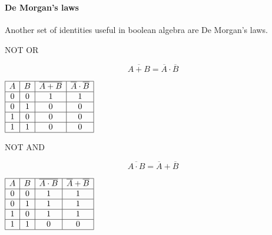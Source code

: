 \documentclass{beamer}
\newenvironment{compactmath}[1][\normalsize]%
	{\begin{minipage}{\textwidth}\vspace{-0.75\baselineskip}#1\begin{equation*}}
	{\end{equation*}\end{minipage}}
\newenvironment{namedframe}[1]%
	{\begin{frame}\frametitle{\secname}\framesubtitle{#1}}
	{\end{frame}}
\newcommand{\negate}[1]{\overline{#1}}
\begin{document}
	\begin{namedframe}{De Morgan's laws}
		Another set of identities useful in boolean algebra are De Morgan's laws.
		\begin{center}
			\pause
			\begin{minipage}{0.425\textwidth}
				\centering
				\begin{block}{NOT OR}
					\begin{compactmath}
						\negate{A + B} = \negate{A} \cdot \negate{B}
					\end{compactmath}
				\end{block}
				\begin{math}
					\begin{array}{|c|c|c|c|}
						\hline
						A & B & \negate{A + B} & \negate{A} \cdot \negate{B}\\\hline
						0 & 0 &  1             &  1                         \\\hline
						0 & 1 &  0             &  0                         \\\hline
						1 & 0 &  0             &  0                         \\\hline
						1 & 1 &  0             &  0                         \\\hline
					\end{array}
				\end{math}
			\end{minipage}
			\hspace{0.025\textwidth}
			\pause
			\begin{minipage}{0.425\textwidth}
				\centering
				\begin{block}{NOT AND}
					\begin{compactmath}
						\negate{A \cdot B} = \negate{A} + \negate{B}
					\end{compactmath}
				\end{block}
				\begin{math}
					\begin{array}{|c|c|c|c|}
						\hline
						A & B & \negate{A \cdot B} & \negate{A} + \negate{B}\\\hline
						0 & 0 &  1             &  1                         \\\hline
						0 & 1 &  1             &  1                         \\\hline
						1 & 0 &  1             &  1                         \\\hline
						1 & 1 &  0             &  0                         \\\hline
					\end{array}
				\end{math}
			\end{minipage}
		\end{center}
	\end{namedframe}
\end{document}
